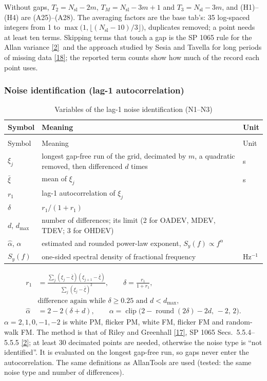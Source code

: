 \documentclass[11pt,a4paper]{article}
\makeatletter
\newcommand{\nist}{\href{https://tf.nist.gov/general/pdf/2220.pdf}{[2]}}
\newcommand{\lagone}{\href{http://www.wriley.com/Paper125Preprint.pdf}{[17]}}
\newcommand{\sesia}{\href{https://hdl.handle.net/11696/29548}{[18]}}
\renewcommand{\_}{\usscore\allowbreak}
\newenvironment{vartable}[2]{%
 \par\small\setlength{\LTpre}{3pt}\setlength{\LTpost}{3pt}%
 \begin{longtable}{@{}>{\raggedright}p{.2\linewidth}>{\raggedright}p{.57\linewidth}>{\raggedright\arraybackslash}p{.17\linewidth}@{}}
 \caption{#2}\label{#1}\\
 \toprule Symbol & Meaning & Unit\\\midrule
 \endfirsthead
 \multicolumn{3}{@{}l}{\footnotesize\itshape Table \thetable{} (continued)}\\
 \toprule Symbol & Meaning & Unit\\\midrule
 \endhead
 \bottomrule
 \endlastfoot}
 {\end{longtable}\normalsize}
\makeatother
\begin{document}
Without gaps, \(T_2=N_{\mathrm{sl}}-2m\), \(T_M=N_{\mathrm{sl}}-3m+1\) and \(T_3=N_{\mathrm{sl}}-3m\), and
(H1)--(H4) are (A25)--(A28). The averaging factors are the base tab's: 35 log-spaced integers from 1
to \(\max\bigl(1,\lfloor(N_{\mathrm{sl}}-10)/3\rfloor\bigr)\), duplicates removed; a point needs at least
ten terms. Skipping terms that touch a gap is the SP 1065 rule for the Allan variance \nist\ and the
approach studied by Sesia and Tavella for long periods of missing data \sesia; the reported term counts
show how much of the record each point uses.

\subsubsection{Noise identification (lag-1 autocorrelation)}
\begin{vartable}{tab:var-N}{Variables of the lag-1 noise identification (N1--N3)}
\(\xi_j\) & longest gap-free run of the grid, decimated by \(m\), a quadratic removed, then differenced \(d\) times & s\\
\(\bar\xi\) & mean of \(\xi_j\) & s\\
\(r_1\) & lag-1 autocorrelation of \(\xi_j\) & 1\\
\(\delta\) & \(r_1/(1+r_1)\) & 1\\
\(d\), \(d_{\max}\) & number of differences; its limit (2 for OADEV, MDEV, TDEV; 3 for OHDEV) & 1\\
\(\hat\alpha\), \(\alpha\) & estimated and rounded power-law exponent, \(S_y(f)\propto f^{\alpha}\) & 1\\
\(S_y(f)\) & one-sided spectral density of fractional frequency & Hz\(^{-1}\)\\
\end{vartable}
\begin{align}
r_1&=\frac{\sum_j(\xi_j-\bar\xi)(\xi_{j+1}-\bar\xi)}{\sum_j(\xi_j-\bar\xi)^2},\qquad
\delta=\frac{r_1}{1+r_1}, \tag{N1}\label{eq:N1}\\
&\text{difference again while } \delta\ge0.25 \text{ and } d<d_{\max}, \tag{N2}\label{eq:N2}\\
\hat\alpha&=2-2(\delta+d),\qquad
\alpha=\operatorname{clip}\bigl(2-\operatorname{round}(2\delta)-2d,\,-2,\,2\bigr). \tag{N3}\label{eq:N3}
\end{align}
\(\alpha=2,1,0,-1,-2\) is white PM, flicker PM, white FM, flicker FM and random-walk FM. The method is
that of Riley and Greenhall \lagone, SP 1065 Secs.~5.5.4--5.5.5 \nist; at least 30 decimated points are
needed, otherwise the noise type is ``not identified''. It is evaluated on the longest gap-free run, so
gaps never enter the autocorrelation. The same definitions as AllanTools are used (tested: the same noise
type and number of differences).
\end{document}
